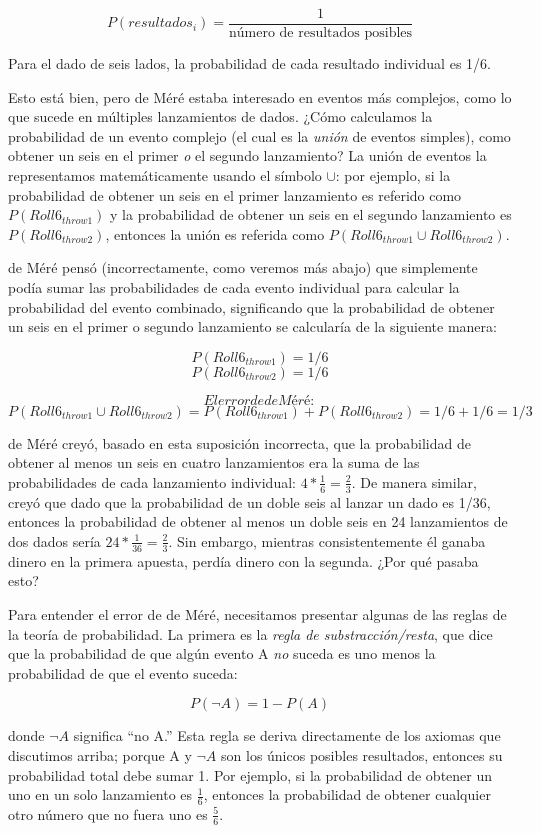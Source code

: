 \documentclass[
  12pt,
]{book}
\begin{document}
\[
P(resultados_i) = \frac{1}{\text{número de resultados posibles}}
\]

Para el dado de seis lados, la probabilidad de cada resultado individual es 1/6.

Esto está bien, pero de Méré estaba interesado en eventos más complejos, como lo que sucede en múltiples lanzamientos de dados. ¿Cómo calculamos la probabilidad de un evento complejo (el cual es la \emph{unión} de eventos simples), como obtener un seis en el primer \emph{o} el segundo lanzamiento? La unión de eventos la representamos matemáticamente usando el símbolo \(\cup\): por ejemplo, si la probabilidad de obtener un seis en el primer lanzamiento es referido como \(P(Roll6_{throw1})\) y la probabilidad de obtener un seis en el segundo lanzamiento es \(P(Roll6_{throw2})\), entonces la unión es referida como \(P(Roll6_{throw1} \cup Roll6_{throw2})\).

de Méré pensó (incorrectamente, como veremos más abajo) que simplemente podía sumar las probabilidades de cada evento individual para calcular la probabilidad del evento combinado, significando que la probabilidad de obtener un seis en el primer o segundo lanzamiento se calcularía de la siguiente manera:

\[
P(Roll6_{throw1}) = 1/6
\]
\[
P(Roll6_{throw2}) = 1/6
\]

\[
El error de de Méré:
\]
\[
P(Roll6_{throw1} \cup Roll6_{throw2}) = P(Roll6_{throw1}) + P(Roll6_{throw2}) = 1/6 + 1/6 = 1/3
\]

de Méré creyó, basado en esta suposición incorrecta, que la probabilidad de obtener al menos un seis en cuatro lanzamientos era la suma de las probabilidades de cada lanzamiento individual: \(4*\frac{1}{6}=\frac{2}{3}\). De manera similar, creyó que dado que la probabilidad de un doble seis al lanzar un dado es 1/36, entonces la probabilidad de obtener al menos un doble seis en 24 lanzamientos de dos dados sería \(24*\frac{1}{36}=\frac{2}{3}\). Sin embargo, mientras consistentemente él ganaba dinero en la primera apuesta, perdía dinero con la segunda. ¿Por qué pasaba esto?

Para entender el error de de Méré, necesitamos presentar algunas de las reglas de la teoría de probabilidad. La primera es la \emph{regla de substracción/resta}, que dice que la probabilidad de que algún evento A \emph{no} suceda es uno menos la probabilidad de que el evento suceda:

\[
P(\neg A) = 1 - P(A)
\]

donde \(\neg A\) significa ``no A.'' Esta regla se deriva directamente de los axiomas que discutimos arriba; porque A y \(\neg A\) son los únicos posibles resultados, entonces su probabilidad total debe sumar 1. Por ejemplo, si la probabilidad de obtener un uno en un solo lanzamiento es \(\frac{1}{6}\), entonces la probabilidad de obtener cualquier otro número que no fuera uno es \(\frac{5}{6}\).
\end{document}
